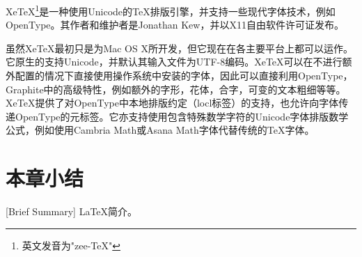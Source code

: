 Xe\TeX{}\footnote{英文发音为"zee-\TeX{}"}是一种使用Unicode的\TeX{}排版引擎，并支持一些现代字体技术，例如OpenType。其作者和维护者是Jonathan Kew，并以X11自由软件许可证发布。

虽然Xe\TeX{}最初只是为Mac OS X所开发，但它现在在各主要平台上都可以运作。它原生的支持Unicode，并默认其输入文件为UTF-8编码。Xe\TeX{}可以在不进行额外配置的情况下直接使用操作系统中安装的字体，因此可以直接利用OpenType，Graphite中的高级特性，例如额外的字形，花体，合字，可变的文本粗细等等。Xe\TeX{}提供了对OpenType中本地排版约定（locl标签）的支持，也允许向字体传递OpenType的元标签。它亦支持使用包含特殊数学字符的Unicode字体排版数学公式，例如使用Cambria Math或Asana Math字体代替传统的\TeX{}字体。

\section*{本章小结}[Brief Summary]
\LaTeX{}简介。